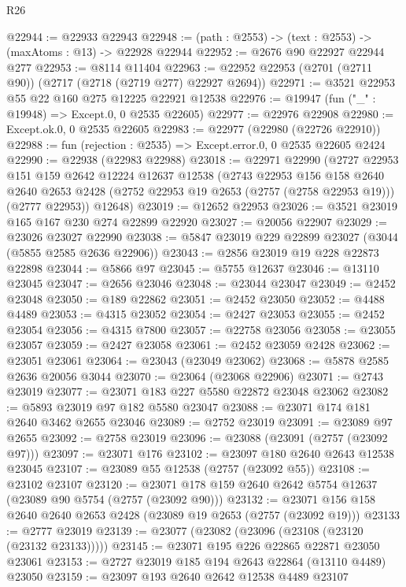 \begin{lexlean}{R26}
\begin{coremodule}
@22944 := @22933 @22943
@22948 := (path : @2553) -> (text : @2553) -> (maxAtoms : @13) -> @22928 @22944
@22952 := @2676 @90 @22927 @22944 @277
@22953 := @8114 @11404
@22963 := @22952 @22953 (@2701 (@2711 @90)) (@2717 (@2718 (@2719 @277) @22927 @2694))
@22971 := @3521 @22953 @55 @22 @160 @275 @12225 @22921 @12538
@22976 := @19947 (fun ("_" : @19948) => Except.{0, 0} @2535 @22605)
@22977 := @22976 @22908
@22980 := Except.ok.{0, 0} @2535 @22605
@22983 := @22977 (@22980 (@22726 @22910))
@22988 := fun (rejection : @2535) => Except.error.{0, 0} @2535 @22605 @2424
@22990 := @22938 (@22983 @22988)
@23018 := @22971
    @22990
    (@2727
      @22953
      @151
      @159
      @2642
      @12224
      @12637
      @12538
      (@2743
        @22953
        @156
        @158
        @2640
        @2640
        @2653
        @2428
        (@2752 @22953 @19 @2653 (@2757 (@2758 @22953 @19)))
        (@2777 @22953))
      @12648)
@23019 := @12652 @22953
@23026 := @3521 @23019 @165 @167 @230 @274 @22899 @22920
@23027 := @20056 @22907
@23029 := @23026 @23027 @22990
@23038 := @5847 @23019 @229 @22899 @23027 (@3044 (@5855 @2585 @2636 @22906))
@23043 := @2856 @23019 @19 @228 @22873 @22898
@23044 := @5866 @97
@23045 := @5755 @12637
@23046 := @13110 @23045
@23047 := @2656 @23046
@23048 := @23044 @23047
@23049 := @2452 @23048
@23050 := @189 @22862
@23051 := @2452 @23050
@23052 := @4488 @4489
@23053 := @4315 @23052
@23054 := @2427 @23053
@23055 := @2452 @23054
@23056 := @4315 @7800
@23057 := @22758 @23056
@23058 := @23055 @23057
@23059 := @2427 @23058
@23061 := @2452 @23059 @2428
@23062 := @23051 @23061
@23064 := @23043 (@23049 @23062)
@23068 := @5878 @2585 @2636 @20056 @3044
@23070 := @23064 (@23068 @22906)
@23071 := @2743 @23019
@23077 := @23071 @183 @227 @5580 @22872 @23048 @23062
@23082 := @5893 @23019 @97 @182 @5580 @23047
@23088 := @23071 @174 @181 @2640 @3462 @2655 @23046
@23089 := @2752 @23019
@23091 := @23089 @97 @2655
@23092 := @2758 @23019
@23096 := @23088 (@23091 (@2757 (@23092 @97)))
@23097 := @23071 @176
@23102 := @23097 @180 @2640 @2643 @12538 @23045
@23107 := @23089 @55 @12538 (@2757 (@23092 @55))
@23108 := @23102 @23107
@23120 := @23071 @178 @159 @2640 @2642 @5754 @12637 (@23089 @90 @5754 (@2757 (@23092 @90)))
@23132 := @23071 @156 @158 @2640 @2640 @2653 @2428 (@23089 @19 @2653 (@2757 (@23092 @19)))
@23133 := @2777 @23019
@23139 := @23077 (@23082 (@23096 (@23108 (@23120 (@23132 @23133)))))
@23145 := @23071 @195 @226 @22865 @22871 @23050 @23061
@23153 := @2727 @23019 @185 @194 @2643 @22864 (@13110 @4489) @23050
@23159 := @23097 @193 @2640 @2642 @12538 @4489 @23107

\end{coremodule}
\end{lexlean}
